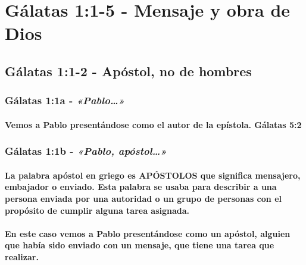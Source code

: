 \documentclass[11a pt,twoside]{article}
\newcommand{\scripture}[1]{%
  {\fontsize{12pt}{16pt}\selectfont\ScriptureFont\itshape #1}%
}
\let\oldsection\section
\renewcommand{\section}{\needspace{6\baselineskip}\oldsection}
\let\oldsubsection\subsection
\renewcommand{\subsection}{\needspace{5\baselineskip}\oldsubsection}
\let\oldsubsubsection\subsubsection
\renewcommand{\subsubsection}{\needspace{4\baselineskip}\oldsubsubsection}
\let\oldparagraph\paragraph
\renewcommand{\paragraph}{\needspace{3\baselineskip}\oldparagraph}
\begin{document}
\section{Gálatas 1:1-5 - Mensaje y obra de
Dios}\label{guxe1latas-11-5---mensaje-y-obra-de-dios}

\subsection{Gálatas 1:1-2 - Apóstol, no de
hombres}\label{guxe1latas-11-2---apuxf3stol-no-de-hombres}

\subsubsection{\texorpdfstring{Gálatas 1:1a -
\scripture{«Pablo…»}}{Gálatas 1:1a - }}\label{guxe1latas-11a---pablo}

\paragraph{Vemos a Pablo presentándose como el autor de la epístola.
Gálatas
5:2}\label{vemos-a-pablo-presentuxe1ndose-como-el-autor-de-la-epuxedstola.-guxe1latas-52}

\subsubsection{\texorpdfstring{Gálatas 1:1b -
\scripture{«Pablo, apóstol…»}}{Gálatas 1:1b - }}\label{guxe1latas-11b---pablo-apuxf3stol}

\paragraph{La palabra apóstol en griego es APÓSTOLOS que significa
mensajero, embajador o enviado. Esta palabra se usaba para describir a
una persona enviada por una autoridad o un grupo de personas con el
propósito de cumplir alguna tarea
asignada.}\label{la-palabra-apuxf3stol-en-griego-es-apuxf3stolos-que-significa-mensajero-embajador-o-enviado.-esta-palabra-se-usaba-para-describir-a-una-persona-enviada-por-una-autoridad-o-un-grupo-de-personas-con-el-propuxf3sito-de-cumplir-alguna-tarea-asignada.}

\paragraph{En este caso vemos a Pablo presentándose como un apóstol,
alguien que había sido enviado con un mensaje, que tiene una tarea que
realizar.}\label{en-este-caso-vemos-a-pablo-presentuxe1ndose-como-un-apuxf3stol-alguien-que-habuxeda-sido-enviado-con-un-mensaje-que-tiene-una-tarea-que-realizar.}
\end{document}
